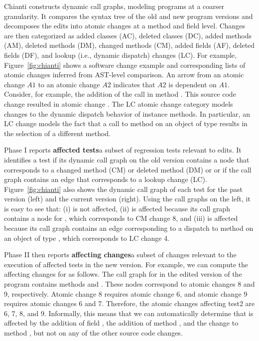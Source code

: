 Chianti constructs dynamic call graphs, modeling programs at a coarser granularity. It compares the syntax tree of the old and new program versions and decomposes the edits into atomic changes at a method and field level. Changes are then categorized as added classes (AC), deleted classes (DC), added methods (AM), deleted methods (DM), changed methods (CM), added fields (AF), deleted fields (DF), and lookup (i.e., dynamic dispatch) changes (LC). For example, Figure~\ref{fig:chianti} shows a software change example and corresponding lists of atomic changes inferred from AST-level comparison. An arrow from an atomic change $A1$ to an atomic change $A2$ indicates that $A2$ is dependent on $A1$. Consider, for example, the addition of the call  in method . This source code change resulted in atomic change . The LC atomic change category models changes to the dynamic dispatch behavior of instance methods. In particular, an LC change  models the fact that a call to method  on an object of type  results in the selection of a different method.

Phase I reports {\bf affected tests}\textemdash a subset of regression tests relevant to edits. It identifies a test if its dynamic call graph on the old version contains a node that corresponds to a changed method (CM) or deleted method (DM)  or or if the call graph contains an edge that corresponds to a lookup change (LC). Figure~\ref{fig:chianti} also shows the dynamic call graph of each test for the past version (left) and the current version (right). Using the call graphs on the left, it is easy to see that: (i)  is not affected, (ii)  is affected because its call graph contains a node for , which corresponds to CM change 8, and (iii)  is affected because its call graph contains an edge corresponding to a dispatch to method  on an object of type , which corresponds to LC change 4.

Phase II then reports {\bf affecting changes}\textemdash a subset of changes relevant to the execution of affected tests in the new version. For example, we can compute the affecting changes for  as follows. The call graph for  in the edited version of the program contains methods  and . These nodes correspond to atomic changes 8 and 9, respectively. Atomic change 8 requires atomic change 6, and atomic change 9 requires atomic changes 6 and 7. Therefore, the atomic changes affecting test2 are 6, 7, 8, and 9. Informally, this means that we can automatically determine that  is affected by the addition of field , the addition of method , and the change to method , but not on any of the other source code changes. 

